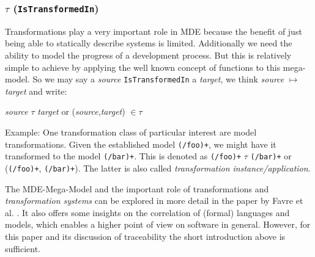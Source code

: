 \subsubsection{$\tau$ (\texttt{IsTransformedIn})}
Transformations play a very important role in MDE because the benefit of just being able to statically describe systems is limited. Additionally we need the ability to model the progress of a development process. But this is relatively simple to achieve by applying the well known concept of functions to this mega-model. So we may say a \textit{source} \texttt{IsTransformedIn} a \textit{target}, we think \textit{source} $\mapsto$ \textit{target} and write:
\begin{center} 
\textit{source} $\tau$ \textit{target}
or 
(\textit{source},\textit{target}) $\in\tau$
\end{center}
Example: One transformation class of particular interest are model transformations. Given the established model \texttt{(/foo)+}, we might have it transformed to the model \texttt{(/bar)+}. This is denoted as  \texttt{(/foo)+} $\tau$ \texttt{(/bar)+} or (\texttt{(/foo)+}, \texttt{(/bar)+}). The latter is also called \textit{transformation instance/application}.
\newline

The MDE-Mega-Model and the important role of transformations and \textit{transformation systems} can be explored in more detail in the paper by Favre et al. \cite{TowardsAMegamodel}. It also offers some insights on the correlation of (formal) languages and models, which enables a higher point of view on software in general. However, for this paper and its discussion of traceability the short introduction above is sufficient.

